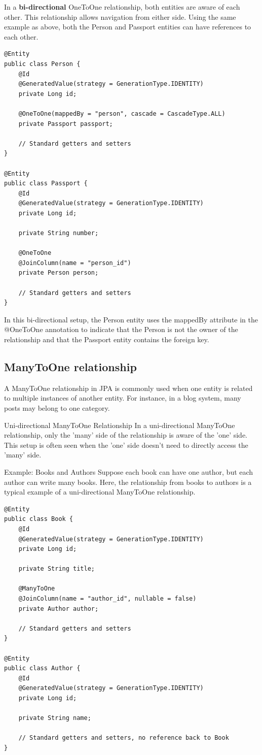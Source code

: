 In a \textbf{bi-directional} OneToOne relationship, both entities are aware of each other. This relationship allows navigation from either side. Using the same example as above, both the Person and Passport entities can have references to each other.

\begin{lstlisting}
@Entity
public class Person {
    @Id
    @GeneratedValue(strategy = GenerationType.IDENTITY)
    private Long id;

    @OneToOne(mappedBy = "person", cascade = CascadeType.ALL)
    private Passport passport;

    // Standard getters and setters
}

@Entity
public class Passport {
    @Id
    @GeneratedValue(strategy = GenerationType.IDENTITY)
    private Long id;

    private String number;

    @OneToOne
    @JoinColumn(name = "person_id")
    private Person person;

    // Standard getters and setters
}
\end{lstlisting}

In this bi-directional setup, the Person entity uses the mappedBy attribute in the @OneToOne annotation to indicate that the Person is not the owner of the relationship and that the Passport entity contains the foreign key.

\subsection{ManyToOne relationship}

A ManyToOne relationship in JPA is commonly used when one entity is related to multiple instances of another entity. For instance, in a blog system, many posts may belong to one category.

Uni-directional ManyToOne Relationship
In a uni-directional ManyToOne relationship, only the 'many' side of the relationship is aware of the 'one' side. This setup is often seen when the 'one' side doesn't need to directly access the 'many' side.

Example: Books and Authors
Suppose each book can have one author, but each author can write many books. Here, the relationship from books to authors is a typical example of a uni-directional ManyToOne relationship.

\begin{lstlisting}
@Entity
public class Book {
    @Id
    @GeneratedValue(strategy = GenerationType.IDENTITY)
    private Long id;

    private String title;

    @ManyToOne
    @JoinColumn(name = "author_id", nullable = false)
    private Author author;

    // Standard getters and setters
}

@Entity
public class Author {
    @Id
    @GeneratedValue(strategy = GenerationType.IDENTITY)
    private Long id;

    private String name;

    // Standard getters and setters, no reference back to Book
}
\end{lstlisting}

